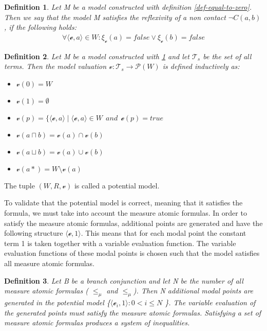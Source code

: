 \documentclass{article}
\newtheorem{defn}{Definition}[section]
\newcommand{\curvedE}{\mathscr{e}}
\newcommand{\vE}{\mathscr{v}}
\newcommand{\vBool}{\xi}
\newcommand{\Ts}{\mathcal{T}_s}
\begin{document}
	\begin{defn}
	\label{def-partial-model}
		Let M be a model constructed with definition \ref{def-equal-to-zero}. Then we say that the model M satisfies the reflexivity of a non contact $\neg C(a, b)$, if the following holds:
		\begin{align*}
			\forall \langle \curvedE, a\rangle \in W: \vBool_{\curvedE}(a) = false \lor \vBool_{\curvedE}(b) = false
		\end{align*}
	\end{defn}		

	\begin{defn}
		Let M be a model constructed with \ref{def-partial-model} and let $\Ts$ be the set of all terms. Then the model valuation $\vE : \Ts \rightarrow \mathscr{P}(W)$ is defined inductively as:
		\begin{itemize}
			\item $\vE(0) = W$
			\item $\vE(1) = \emptyset$
			\item $\vE(p) = \{ \langle \curvedE, a \rangle \; | \; \langle \curvedE, a \rangle \in W \:\:\textit{and}\:\: \curvedE(p) = \textit{true}$
			\item $\vE(a \sqcap b) = \vE(a) \cap \vE(b)$
			\item $\vE(a \sqcup b) = \vE(a) \cup \vE(b)$
			\item $\vE(a*) = W \setminus \vE(a)$
		\end{itemize}
	\end{defn}
	\leavevmode\newline
	The tuple $(W, R, \vE)$ is called a potential model.

	\leavevmode\newline
	To validate that the potential model is correct, meaning that it satisfies the formula, we must take into account the measure atomic formulas. 
	In order to satisfy the measure atomic formulas, additional points are generated and have the following structure $\langle \curvedE, 1 \rangle$. This means that 
	for each modal point the constant term 1 is taken together with a variable evaluation function. The variable evaluation functions of these modal points 
	is chosen such that the model satisfies all measure atomic formulas.

	\begin{defn}
		Let B be a branch conjunction and let N be the number of all measure atomic formulas ( $\le_\mu$ and $\leq_\mu$).
		Then N additional modal points are generated in the potential model \{$\langle \curvedE_i, 1 \rangle : 0 < i \leq N$ \}. The variable evaluation of the generated points must satisfy the measure atomic formulas.
		Satisfying a set of measure atomic formulas produces a system of inequalities.
	\end{defn}
\end{document}
